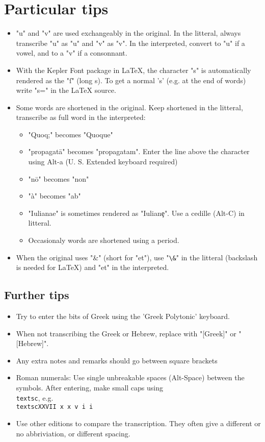 \documentclass{report}
\begin{document}
\section{Particular tips}
\begin{itemize}
\item "u" and "v" are used exchangeably in the original. In the litteral, always transcribe "u" as "u" and "v" as "v". In the interpreted, convert to "u" if a vowel, and to a "v" if a consonnant.
\item With the Kepler Font package in LaTeX, the character "s" is automatically rendered as the "ſ" (long s). To get a normal 's' (e.g. at the end of words) write "s=" in the LaTeX source.
\item Some words are shortened in the original.  Keep shortened in the litteral, transcribe as full word in the interpreted:
\begin{itemize}
\item "Quoq;" becomes "Quoque"
\item "propagatā" becomes "propagatam". Enter the line above the character using Alt-a (U. S. Extended keyboard required)
\item "nō" becomes "non"
\item "à" becomes "ab"
\item "Iulianae" is sometimes rendered as "Iulianȩ". Use a cedille (Alt-C) in litteral.
\item Occasionaly words are shortened using a period.
\end{itemize}
\item When the original uses "\&" (short for "et"), use "\verb+\&+" in the litteral (backslash is needed for LaTeX) and "et" in the interpreted.
\end{itemize}

\subsection{Further tips}
\begin{itemize}
\item Try to enter the bits of Greek using the 'Greek Polytonic' keyboard.
\item When not transcribing the Greek or Hebrew, replace with "[Greek]" or "[Hebrew]".
\item Any extra notes and remarks should go between square brackets
\item Roman numerals: Use single unbreakable spaces (Alt-Space) between the symbols. After entering, make small caps using \texttt{\\textsc}, e.g. \texttt{\\textsc{XXVII x x v i i}}
\item Use other editions to compare the transcription. They often give a different or no abbriviation, or different spacing.
\end{itemize}
\end{document}
